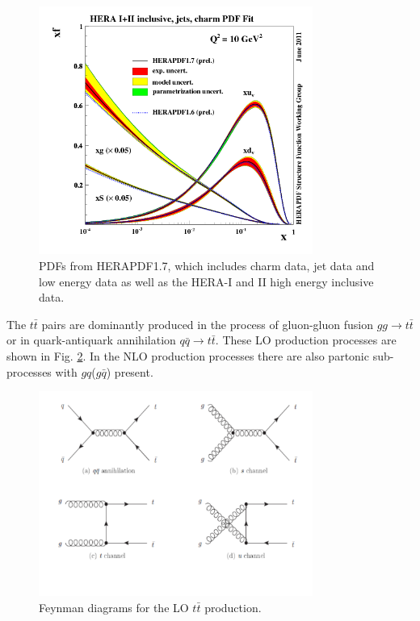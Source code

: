 \begin{figure}[t]
  \centering
  \includegraphics[width=0.8\textwidth]{01_Theory_SM/plots/herapdf17.png}
  \caption{PDFs from HERAPDF1.7, which includes charm data, jet data and low energy data as well as the HERA-I and II high energy inclusive data.}
  \label{fig:HERA_PDF}
\end{figure}

The $t\bar{t}$ pairs are dominantly produced in the process of gluon-gluon fusion $gg \rightarrow t\bar{t}$ or in quark-antiquark annihilation $q\bar{q} \rightarrow t\bar{t}$.
These LO production processes are shown in Fig. \ref{fig:LO_tt_prod}. In the NLO production processes there are also partonic sub-processes with $gq$($g\bar{q}$) present.

\begin{figure}[h]
  \centering
  \includegraphics[width=0.8\textwidth]{01_Theory_SM/plots/LO_tt_production.pdf}
  \caption{Feynman diagrams for the LO $t\bar{t}$ production.}
  \label{fig:LO_tt_prod}
\end{figure}

